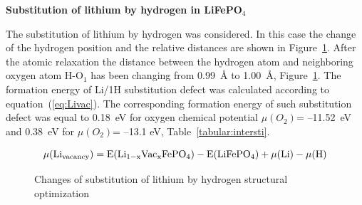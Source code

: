 
\par\bigskip
\textbf{Substitution of lithium by hydrogen in LiFePO$_4$}

The substitution of lithium by hydrogen  was considered. In this case the change of the hydrogen position and the relative distances are shown in Figure~\ref{ris:Li1H}. After the atomic relaxation the distance between the hydrogen atom and neighboring oxygen atom H-O$_1$ has been changing from 0.99{~\AA} to 1.00{~\AA}, Figure~\ref{ris:Li1H}. The formation energy of Li/1H substitution defect was calculated according to equation~(\ref{eq:Livac}). The corresponding formation energy of such substitution defect was equal to 0.18~eV for oxygen chemical potential $\mu(O_2)$= --11.52~eV and 0.38~eV for $\mu(O_2)$= --13.1 eV, Table~\ref{tabular:intersti}.

\begin{equation}
\label{eq:Livac}
\mu(\rm Li_{vacancy})=E(\rm Li_{1-x}Vac_{x}FePO_4)-E(\rm LiFePO_4)+\mu(\rm Li)-\mu(\rm H) 
\end{equation}

\begin{figure}[h]
\begin{minipage}[h]{0.49\linewidth}
\end{minipage}
\hfill
\begin{minipage}[h]{0.49\linewidth}
\end{minipage}
\caption{Changes of substitution of lithium by hydrogen structural optimization}
\label{ris:Li1H}
\end{figure}

